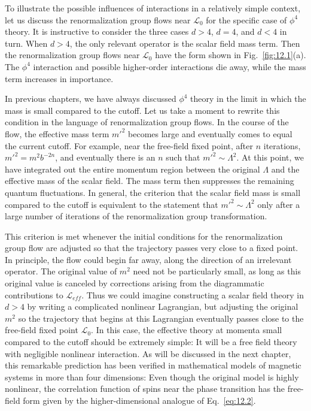 To illustrate the possible influences of interactions in a relatively simple
context, let us discuss the renormalization group flows near $\mathcal{L}_0$
for the specific case of $\phi^4$ theory.  It is instructive to consider the
three cases $d > 4$, $d = 4$, and $d < 4$ in turn.  When $d > 4$, the only
relevant operator is the scalar field mass term.  Then the renormalization
group flows near $\mathcal{L}_0$ have the form shown in
Fig.~\ref{fig:12.1}(a).  The $\phi^4$ interaction and possible higher-order
interactions die away, while the mass term increases in importance.

In previous chapters, we have always discussed $\phi^4$ theory in the limit in
which the mass is small compared to the cutoff.  Let us take a moment to
rewrite this condition in the language of renormalization group flows.  In
the course of the flow, the effective mass term $m'^2$ becomes large and
eventually comes to equal the current cutoff.  For example, near the
free-field fixed point, after $n$ iterations, $m'^2 = m^2b^{-2n}$, and
eventually there is an $n$ such that $m'^2 \sim \Lambda^2$.  At this point, we
have integrated out the entire momentum region between the original
$\Lambda$ and the effective mass of the scalar field.  The mass term then
suppresses the remaining quantum fluctuations.  In general, the criterion
that the scalar field mass is small compared to the cutoff is equivalent to
the statement that $m'^2 \sim \Lambda^2$ only after a large number of
iterations of the renormalization group transformation.

This criterion is met whenever the initial conditions for the renormalization
group flow are adjusted so that the trajectory passes very close to a fixed
point.  In principle, the flow could begin far away, along the direction of an
irrelevant operator.  The original value of $m^2$ need not be particularly
small, as long as this original value is canceled by corrections arising from
the diagrammatic contributions to $\mathcal{L}_{eff}$.  Thus we could imagine
constructing a scalar field theory in $d > 4$ by writing a complicated
nonlinear Lagrangian, but adjusting the original $m^2$ so the trajectory that
begins at this Lagrangian eventually passes close to the free-field fixed
point $\mathcal{L}_0$.  In this case, the effective theory at momenta small
compared to the cutoff should be extremely simple: It will be a free field
theory with negligible nonlinear interaction.  As will be discussed in the
next chapter, this remarkable prediction has been verified in mathematical
models of magnetic systems in more than four dimensions: Even though the
original model is highly nonlinear, the correlation function of spins near
the phase transition has the free-field form given by the higher-dimensional
analogue of Eq.~\eqref{eq:12.2}.

